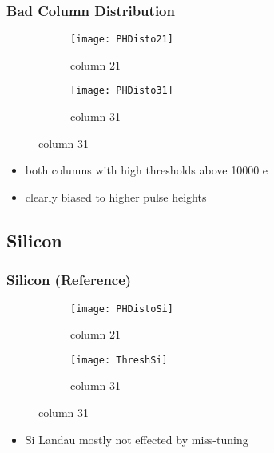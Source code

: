 \begin{frame}
	\frametitle{Bad Column Distribution}
	\begin{figure} 
		\begin{center}
			\begin{subfigure}{0.45\textwidth}  
				\centering 
				\texttt{[image: PHDisto21]}
				\caption{column 21}
			\end{subfigure}
			\begin{subfigure}{0.45\textwidth} 
				\centering 
				\texttt{[image: PHDisto31]}
				\caption{column 31}
			\end{subfigure} 
		\end{center}
	\end{figure}
	\begin{itemize}
		\item both columns with high thresholds above 10000 e
		\item clearly biased to higher pulse heights
	\end{itemize}
\end{frame}
\subsection{Silicon}
\begin{frame}
	\frametitle{Silicon (Reference)}
	\begin{figure} 
		\begin{center}
			\begin{subfigure}{0.45\textwidth}  
				\centering 
				\texttt{[image: PHDistoSi]}
				\caption{column 21}
			\end{subfigure}
			\begin{subfigure}{0.45\textwidth} 
				\centering 
				\texttt{[image: ThreshSi]}
				\caption{column 31}
			\end{subfigure} 
		\end{center}
	\end{figure}
	\begin{itemize}
		\item Si Landau mostly not effected by miss-tuning
	\end{itemize}
\end{frame}